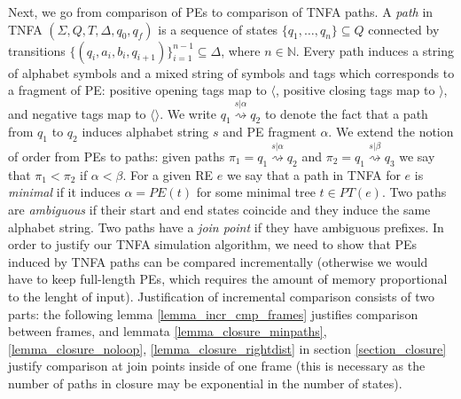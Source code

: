 \documentclass[AMA,STIX1COL]{WileyNJD-v2}
\newcommand{\Xl}{\langle}
\newcommand{\Xr}{\rangle}
\newcommand{\Xm}{\langle\!\rangle}
\newcommand{\YN}{\mathbb{N}}
\newcommand{\PT}{PT}
\newcommand{\PE}{P\!E}
\begin{document}
Next, we go from comparison of PEs to comparison of TNFA paths.
%
A \emph{path} in TNFA $(\Sigma, Q, T, \Delta, q_0, q_f)$
is a sequence of states $\{q_1, \hdots, q_n\} \subseteq Q$
connected by transitions $\{(q_i, a_i, b_i, q_{i + 1})\}_{i=1}^{n-1} \subseteq \Delta$, where $n \in \YN$.
%
Every path induces a string of alphabet symbols
and a mixed string of symbols and tags which corresponds to a fragment of PE:
positive opening tags map to $\Xl$,
positive closing tags map to $\Xr$,
and negative tags map to $\Xm$.
We write $q_1 \overset {s|\alpha} {\rightsquigarrow} q_2$
to denote the fact that a path from $q_1$ to $q_2$ induces alphabet string $s$ and PE fragment $\alpha$.
%
We extend the notion of order from PEs to paths: given paths
$\pi_1 = q_1 \overset {s|\alpha} {\rightsquigarrow} q_2$ and
$\pi_2 = q_1 \overset {s|\beta} {\rightsquigarrow} q_3$
we say that $\pi_1 < \pi_2$ if $\alpha < \beta$.
%
For a given RE $e$ we say that a path in TNFA for $e$ is \emph{minimal} if it induces
$\alpha = \PE(t)$ for some minimal tree $t \in \PT(e)$.
%
Two paths are \emph{ambiguous} if their start and end states coincide and they induce the same alphabet string.
Two paths have a \emph{join point} if they have ambiguous prefixes.
%
In order to justify our TNFA simulation algorithm,
we need to show that PEs induced by TNFA paths can be compared incrementally
(otherwise we would have to keep full-length PEs, which requires the amount of memory proportional to the lenght of input).
Justification of incremental comparison consists of two parts:
the following lemma \ref{lemma_incr_cmp_frames} justifies comparison between frames,
and lemmata \ref{lemma_closure_minpaths}, \ref{lemma_closure_noloop}, \ref{lemma_closure_rightdist}
in section \ref{section_closure} justify comparison at join points inside of one frame
(this is necessary as the number of paths in closure may be exponential in the number of states).
\end{document}

